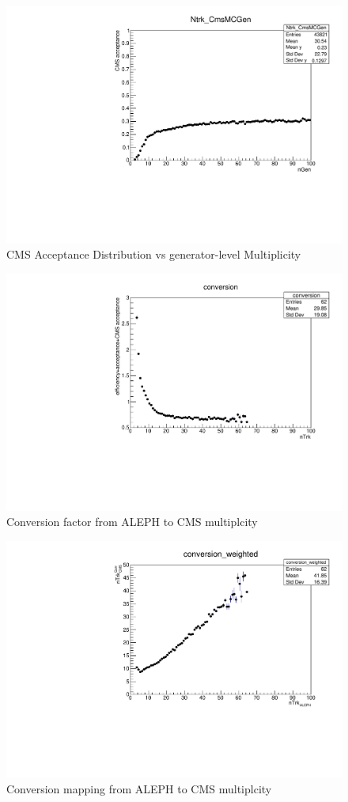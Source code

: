 \begin{figure}[!htb]
\begin{center}
\includegraphics[width=.45\textwidth]{images/MultiplicityConversion/nTrk_CMSMCGen.pdf}
\caption{CMS Acceptance Distribution vs generator-level Multiplicity}
\label{fig:CMSAcc} 
\end{center}
\end{figure}

\begin{figure}[!htb]
\begin{center}
\includegraphics[width=.45\textwidth]{images/MultiplicityConversion/conversion.pdf}
\caption{Conversion factor from ALEPH to CMS multiplcity}
\label{fig:conversion} 
\end{center}
\end{figure}

\begin{figure}[!htb]
\begin{center}
\includegraphics[width=.45\textwidth]{images/MultiplicityConversion/conversion_weighted.pdf}
\caption{Conversion mapping from ALEPH to CMS multiplcity}
\label{fig:conversion2} 
\end{center}
\end{figure}

